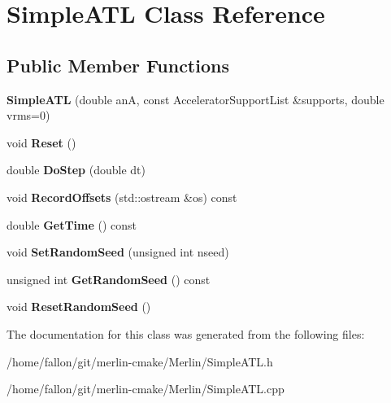 \hypertarget{classSimpleATL}{}\section{Simple\+A\+TL Class Reference}
\label{classSimpleATL}
\subsection*{Public Member Functions}
\begin{DoxyCompactItemize}
\item 
\mbox{\label{classSimpleATL_a8b8ebe2761c4c512c8f80fb7a000c1d2}} 
{\bfseries Simple\+A\+TL} (double anA, const Accelerator\+Support\+List \&supports, double vrms=0)
\item 
\mbox{\label{classSimpleATL_a89851c52d7e8314783223b750c07f67e}} 
void {\bfseries Reset} ()
\item 
\mbox{\label{classSimpleATL_a5611757cd357935dcf4c29464a1277ec}} 
double {\bfseries Do\+Step} (double dt)
\item 
\mbox{\label{classSimpleATL_a60968ccc1c256d539d93f87f927be3e1}} 
void {\bfseries Record\+Offsets} (std\+::ostream \&os) const
\item 
\mbox{\label{classSimpleATL_a947d9a7c71261695d45764b98cfa3788}} 
double {\bfseries Get\+Time} () const
\item 
\mbox{\label{classSimpleATL_af77f7828d190558124103e222796f8d5}} 
void {\bfseries Set\+Random\+Seed} (unsigned int nseed)
\item 
\mbox{\label{classSimpleATL_a694c05b82de7abbbee61ed59d24f715c}} 
unsigned int {\bfseries Get\+Random\+Seed} () const
\item 
\mbox{\label{classSimpleATL_a16aaa37b1e6be201731cb091338284f2}} 
void {\bfseries Reset\+Random\+Seed} ()
\end{DoxyCompactItemize}


The documentation for this class was generated from the following files\+:\begin{DoxyCompactItemize}
\item 
/home/fallon/git/merlin-\/cmake/\+Merlin/Simple\+A\+T\+L.\+h\item 
/home/fallon/git/merlin-\/cmake/\+Merlin/Simple\+A\+T\+L.\+cpp\end{DoxyCompactItemize}
